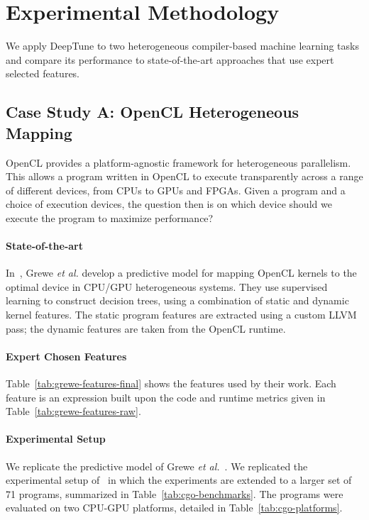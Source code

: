 \section{Experimental Methodology}\label{sec:methodology}

We apply DeepTune to two heterogeneous compiler-based machine learning tasks and
compare its performance to state-of-the-art approaches that use expert selected
features.


\subsection{Case Study A: OpenCL Heterogeneous Mapping} \label{subsec:case-study-a}



OpenCL provides a platform-agnostic framework for heterogeneous parallelism.
This allows a program written in OpenCL to execute transparently across a range
of different devices, from CPUs to GPUs and FPGAs. Given a program and a choice
of execution devices, the question then is on which device should we execute the
program to maximize performance?

\paragraph{State-of-the-art} In~\cite{Grewe2013}, Grewe \emph{et al.} develop a
predictive model for mapping OpenCL kernels to the optimal device in CPU/GPU
heterogeneous systems. They use supervised learning to construct decision trees,
using a combination of static and dynamic kernel features. The static program
features are extracted using a custom LLVM pass; the dynamic features are taken
from the OpenCL runtime.

\paragraph{Expert Chosen Features} Table~\ref{tab:grewe-features-final} shows
the features used by their work. Each feature is an expression built upon the
code and runtime metrics given in Table~\ref{tab:grewe-features-raw}.

\paragraph{Experimental Setup} We replicate the predictive model of Grewe
\emph{et al.}~\cite{Grewe2013}. We replicated the experimental setup
of~\cite{Cummins2017a} in which the experiments are extended to a larger set of
71 programs, summarized in Table~\ref{tab:cgo-benchmarks}. The programs were
evaluated on two CPU-GPU platforms, detailed in Table~\ref{tab:cgo-platforms}.

